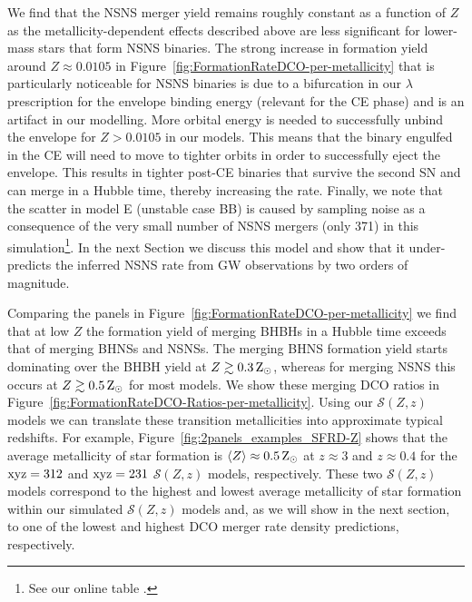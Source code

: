 \documentclass[fleqn,usenatbib]{mnras}
\newcommand{\Zi}{\ensuremath{Z}\xspace}
\newcommand{\Zsun}{\ensuremath{\,\rm{Z}_{\odot}}\xspace}
\newcommand{\SFRD}{\ensuremath{\mathcal{S}(Z,z)}\xspace}
\begin{document}
We find that the \ac{NSNS} merger yield remains roughly constant as a function of \Zi \citep[cf.,][]{Chruslinska:2018,2018A&A...619A..77K, GiacobboMapelli:2018,Neijssel:2019} as the metallicity-dependent effects described above are less significant for lower-mass stars that form \ac{NSNS} binaries. The strong increase in formation yield around $\Zi \approx 0.0105$ in Figure~\ref{fig:FormationRateDCO-per-metallicity} that is particularly noticeable for \ac{NSNS} binaries is due to a bifurcation in our $\lambda$ prescription for the envelope binding energy (relevant for the \ac{CE} phase) and is an artifact in our modelling.  More orbital energy is needed to successfully unbind the envelope for $\Zi >0.0105$ in our models. This means that the binary engulfed in the \ac{CE} will need to move to tighter orbits in order to successfully eject the envelope. This results in tighter post-\ac{CE} binaries that survive the second \ac{SN} and can merge in a Hubble time, thereby increasing the rate. 
Finally, we note that the scatter in model E (unstable case BB) is caused by sampling noise as a consequence of the very small number of \ac{NSNS} mergers (only 371) in this simulation\footnote{See our online table \href{https://raw.githubusercontent.com/FloorBroekgaarden/Double-Compact-Object-Mergers/main/otherFiles/DCO_table_detailed.png}{\faFileImage}.}. In the next Section we discuss this model and  show that it under-predicts the inferred NSNS rate from \ac{GW} observations by two orders of magnitude. 

Comparing the panels in Figure~\ref{fig:FormationRateDCO-per-metallicity} we find that at low \Zi the formation yield of merging \acp{BHBH} in a Hubble time exceeds that of merging \acp{BHNS} and \acp{NSNS}. The merging \ac{BHNS} formation yield starts dominating over the \ac{BHBH} yield at $\Zi \gtrsim 0.3\Zsun$, whereas for merging \ac{NSNS} this occurs at $\Zi \gtrsim 0.5\Zsun$ for most models.   We show these merging \ac{DCO} ratios in  Figure~\ref{fig:FormationRateDCO-Ratios-per-metallicity}. Using our \SFRD models we can translate these transition metallicities into approximate typical redshifts. For example, Figure~\ref{fig:2panels_examples_SFRD-Z} shows that the average metallicity of star formation is  $\langle \Zi \rangle \approx 0.5\Zsun$ at $z\approx 3$ and $z\approx 0.4$ for the $\rm{xyz}=312$ and $\rm{xyz}=231$ \SFRD models, respectively. These two \SFRD models correspond to the highest and lowest average metallicity of star formation within our simulated \SFRD models and, as we will show in the next section, to one of the lowest and highest \ac{DCO} merger rate density predictions, respectively. 
\end{document}
